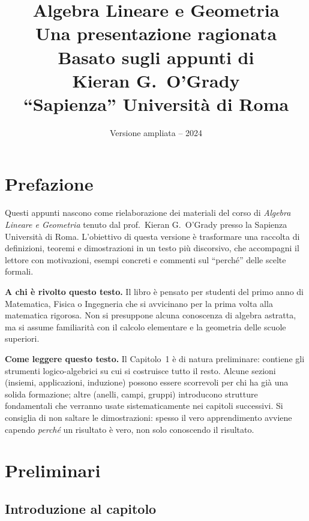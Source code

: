 \documentclass[11pt, a4paper]{book}
\title{
  \Huge\bfseries Algebra Lineare e Geometria\\[1em]
  \large Una presentazione ragionata\\[2em]
  \normalsize Basato sugli appunti di\\
  \large Kieran G.\ O'Grady\\
  \normalsize ``Sapienza'' Università di Roma
}
\author{}
\date{Versione ampliata -- 2024}
\theoremstyle{definition}
\theoremstyle{plain}
\theoremstyle{remark}
\begin{document}

\maketitle
\tableofcontents

\chapter*{Prefazione}

Questi appunti nascono come rielaborazione dei materiali del corso di \emph{Algebra Lineare e Geometria} tenuto dal prof.\ Kieran G.\ O'Grady presso la Sapienza Università di Roma. L'obiettivo di questa versione è trasformare una raccolta di definizioni, teoremi e dimostrazioni in un testo più discorsivo, che accompagni il lettore con motivazioni, esempi concreti e commenti sul ``perché'' delle scelte formali.

\medskip
\noindent\textbf{A chi è rivolto questo testo.} Il libro è pensato per studenti del primo anno di Matematica, Fisica o Ingegneria che si avvicinano per la prima volta alla matematica rigorosa. Non si presuppone alcuna conoscenza di algebra astratta, ma si assume familiarità con il calcolo elementare e la geometria delle scuole superiori.

\medskip
\noindent\textbf{Come leggere questo testo.} Il Capitolo~1 è di natura preliminare: contiene gli strumenti logico-algebrici su cui si costruisce tutto il resto. Alcune sezioni (insiemi, applicazioni, induzione) possono essere scorrevoli per chi ha già una solida formazione; altre (anelli, campi, gruppi) introducono strutture fondamentali che verranno usate sistematicamente nei capitoli successivi. Si consiglia di non saltare le dimostrazioni: spesso il vero apprendimento avviene capendo \emph{perché} un risultato è vero, non solo conoscendo il risultato.

\chapter{Preliminari}

\section*{Introduzione al capitolo}
\end{document}
